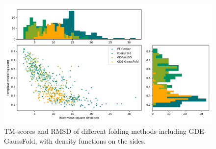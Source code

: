     \begin{figure}[H]
      \begin{center}
        \includegraphics[width=\textwidth, keepaspectratio]{imgs/gde.png}
         \caption{TM-scores and RMSD of different folding methods including
         GDE-GaussFold, with density functions on the sides.}
        \label{gde_results}
      \end{center}
    \end{figure}


